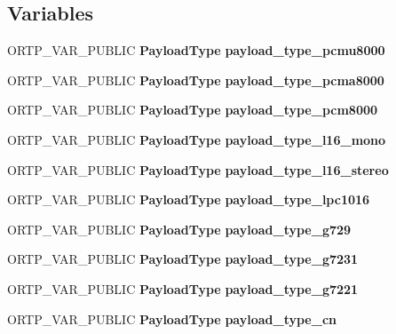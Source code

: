 \subsection*{Variables}
\begin{DoxyCompactItemize}
\item 
\mbox{\label{payloadtype_8h_a469980e2a4a05c0832540d4fa98ba5f0}} 
O\+R\+T\+P\+\_\+\+V\+A\+R\+\_\+\+P\+U\+B\+L\+IC \textbf{ Payload\+Type} {\bfseries payload\+\_\+type\+\_\+pcmu8000}
\item 
\mbox{\label{payloadtype_8h_ad7367d052b308d002715041f4d4142e1}} 
O\+R\+T\+P\+\_\+\+V\+A\+R\+\_\+\+P\+U\+B\+L\+IC \textbf{ Payload\+Type} {\bfseries payload\+\_\+type\+\_\+pcma8000}
\item 
\mbox{\label{payloadtype_8h_aba74f1d5ee35cf2da88cb42ced88ad6c}} 
O\+R\+T\+P\+\_\+\+V\+A\+R\+\_\+\+P\+U\+B\+L\+IC \textbf{ Payload\+Type} {\bfseries payload\+\_\+type\+\_\+pcm8000}
\item 
\mbox{\label{payloadtype_8h_ae6eac1e15a137d109550cee1d9f2920a}} 
O\+R\+T\+P\+\_\+\+V\+A\+R\+\_\+\+P\+U\+B\+L\+IC \textbf{ Payload\+Type} {\bfseries payload\+\_\+type\+\_\+l16\+\_\+mono}
\item 
\mbox{\label{payloadtype_8h_a61e0402b2bffcf8f4626382e3e36fc9b}} 
O\+R\+T\+P\+\_\+\+V\+A\+R\+\_\+\+P\+U\+B\+L\+IC \textbf{ Payload\+Type} {\bfseries payload\+\_\+type\+\_\+l16\+\_\+stereo}
\item 
\mbox{\label{payloadtype_8h_a0a123e2c0709010ad05275f613e410dd}} 
O\+R\+T\+P\+\_\+\+V\+A\+R\+\_\+\+P\+U\+B\+L\+IC \textbf{ Payload\+Type} {\bfseries payload\+\_\+type\+\_\+lpc1016}
\item 
\mbox{\label{payloadtype_8h_af9219bf813ae8a1e9a717f53d4013d4c}} 
O\+R\+T\+P\+\_\+\+V\+A\+R\+\_\+\+P\+U\+B\+L\+IC \textbf{ Payload\+Type} {\bfseries payload\+\_\+type\+\_\+g729}
\item 
\mbox{\label{payloadtype_8h_a2cd34476463e1ad69da5d79c9a07b4cc}} 
O\+R\+T\+P\+\_\+\+V\+A\+R\+\_\+\+P\+U\+B\+L\+IC \textbf{ Payload\+Type} {\bfseries payload\+\_\+type\+\_\+g7231}
\item 
\mbox{\label{payloadtype_8h_ae07a057f2d205f37b9bff2fe75d3583c}} 
O\+R\+T\+P\+\_\+\+V\+A\+R\+\_\+\+P\+U\+B\+L\+IC \textbf{ Payload\+Type} {\bfseries payload\+\_\+type\+\_\+g7221}
\item 
\mbox{\label{payloadtype_8h_a2d74f2c907d2fbce1d33ae49e449aa05}} 
O\+R\+T\+P\+\_\+\+V\+A\+R\+\_\+\+P\+U\+B\+L\+IC \textbf{ Payload\+Type} {\bfseries payload\+\_\+type\+\_\+cn}
\item 
\mbox{\label{payloadtype_8h_ad515cb4993772e38954be63883dc2fdd}} 

\end{DoxyCompactItemize}
